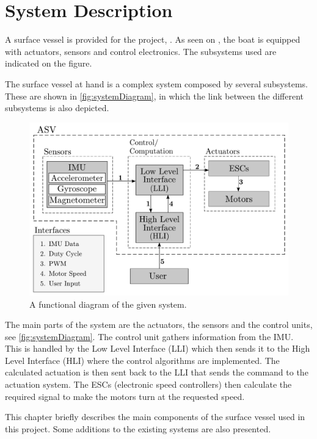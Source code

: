 \chapter{System Description}
A surface vessel is provided for the project, \cite{aauship}. As seen on , the boat is equipped with actuators, sensors and control electronics. The subsystems used are indicated on the figure.

The surface vessel at hand is a complex system composed by several subsystems. These are shown in \autoref{fig:systemDiagram}, in which the link between the different subsystems is also depicted.
%
\begin{figure}[H]
    \includegraphics[width=.65\textwidth]{figures/systemDiagram4}
    \caption{A functional diagram of the given system.}
    \label{fig:systemDiagram}
\end{figure}
%
The main parts of the system are the actuators, the sensors and the control units, see \autoref{fig:systemDiagram}. The control unit gathers information from the IMU. This is handled by the Low Level Interface (LLI) which then sends it to the High Level Interface (HLI) where the control algorithms are implemented. The calculated actuation is then sent back to the LLI that sends the command to the actuation system. The ESCs (electronic speed controllers) then calculate the required signal to make the motors turn at the requested speed. 

This chapter briefly describes the main components of the surface vessel used in this project. Some additions to the existing systems are also presented.

